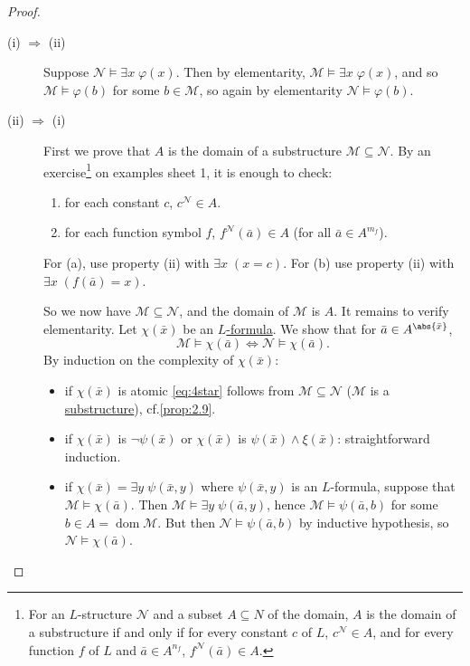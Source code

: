 \documentclass{article}
\let\models\vDash
\DeclareMathOperator{\dom}{dom}
\begin{document}
\begin{proof}\leavevmode
  \begin{description}
    \item [(i) $\Rightarrow$ (ii)] Suppose $\mathcal{N} \models \exists x \; \varphi(x)$.
      Then by elementarity, $\mathcal{M} \models \exists x \; \varphi(x)$, and so $\mathcal{M} \models \varphi(b)$ for some $b \in \mathcal{M}$, so again by elementarity $\mathcal{N} \models \varphi(b)$.
    \item [(ii) $\Rightarrow$ (i)] First we prove that $A$ is the domain of a substructure $\mathcal{M} \subseteq \mathcal{N}$.
      By an exercise\footnote{For an $L$-structure $\mathcal{N}$ and a subset $A \subseteq N$ of the domain, $A$ is the domain of a substructure if and only if for every constant $c$ of $L$, $c^\mathcal{N} \in A$, and for every function $f$ of $L$ and $\bar a \in A^{n_f}$, $f^\mathcal{N}(\bar a) \in A$.} on examples sheet 1, it is enough to check:
      \begin{enumerate}[label=(\alph*)]
        \item for each constant $c$, $c^\mathcal{N} \in A$.
        \item for each function symbol $f$, $f^{\mathcal{N}}(\bar{a}) \in A$ (for all $\bar{a} \in A^{m_f}$).
      \end{enumerate}
      For (a), use property (ii) with $\exists x\; (x = c)$. For (b) use property (ii) with $\exists x\; (f(\bar{a}) = x)$.

      So we now have $\mathcal{M} \subseteq \mathcal{N}$, and the domain of $\mathcal{M}$ is $A$.
      It remains to verify elementarity.
      Let $\chi(\bar{x})$ be an \hyperlink{def:form}{$L$-formula}.
      We show that for $\bar{a} \in A^{\abs{\bar{x}}}$,
      \begin{equation*}
        \mathcal{M} \models \chi(\bar{a}) \iff \mathcal{N} \models \chi(\bar{a}). \tag{$*$} \label{eq:4star}
      \end{equation*}
      By induction on the complexity of $\chi(\bar{x})$:
      \begin{itemize}[label=--]
        \item if $\chi(\bar{x})$ is atomic \eqref{eq:4star} follows from $\mathcal{M} \subseteq \mathcal{N}$ ($\mathcal{M}$ is a \hyperlink{def:subs}{substructure}), cf.\@ \cref{prop:2.9}.
        \item if $\chi(\bar{x})$ is $\neg \psi(\bar{x})$ or $\chi(\bar{x})$ is $\psi(\bar{x}) \wedge \xi(\bar{x})$: straightforward induction.
        \item if $\chi(\bar{x}) = \exists y \; \psi(\bar{x},y)$ where $\psi(\bar{x},y)$ is an $L$-formula, suppose that $\mathcal{M} \models \chi(\bar{a})$.
          Then $\mathcal{M} \models \exists y \; \psi(\bar{a}, y)$, hence $\mathcal{M} \models \psi(\bar{a},b)$ for some $b \in A = \dom \mathcal{M}$.
          But then $\mathcal{N} \models \psi(\bar{a},b)$ by inductive hypothesis, so $\mathcal{N} \models \chi(\bar{a})$.


\end{itemize}
\end{description}
\end{proof}
\end{document}
